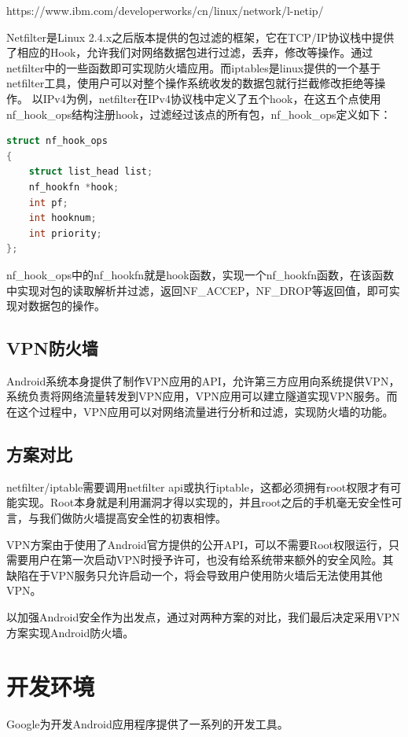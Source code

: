 \documentclass[format=final, language=chinese, degree=fyp]{hustthesis}
\begin{document}
https://www.ibm.com/developerworks/cn/linux/network/l-netip/

Netfilter是Linux 2.4.x之后版本提供的包过滤的框架，它在TCP/IP协议栈中提供了相应的Hook，允许我们对网络数据包进行过滤，丢弃，修改等操作。通过netfilter中的一些函数即可实现防火墙应用。而iptables是linux提供的一个基于netfilter工具，使用户可以对整个操作系统收发的数据包就行拦截修改拒绝等操作。
以IPv4为例，netfilter在IPv4协议栈中定义了五个hook，在这五个点使用nf\_hook\_ops结构注册hook，过滤经过该点的所有包，nf\_hook\_ops定义如下：

\begin{lstlisting}[language=c]
struct nf_hook_ops
{
    struct list_head list;
    nf_hookfn *hook;
    int pf;
    int hooknum;
    int priority;
};
\end{lstlisting}

nf\_hook\_ops中的nf\_hookfn就是hook函数，实现一个nf\_hookfn函数，在该函数中实现对包的读取解析并过滤，返回NF\_ACCEP，NF\_DROP等返回值，即可实现对数据包的操作。

\subsection{VPN防火墙}

Android系统本身提供了制作VPN应用的API，允许第三方应用向系统提供VPN，系统负责将网络流量转发到VPN应用，VPN应用可以建立隧道实现VPN服务。而在这个过程中，VPN应用可以对网络流量进行分析和过滤，实现防火墙的功能。

\subsection{方案对比}
netfilter/iptable需要调用netfilter api或执行iptable，这都必须拥有root权限才有可能实现。Root本身就是利用漏洞才得以实现的，并且root之后的手机毫无安全性可言，与我们做防火墙提高安全性的初衷相悖。

VPN方案由于使用了Android官方提供的公开API，可以不需要Root权限运行，只需要用户在第一次启动VPN时授予许可，也没有给系统带来额外的安全风险。其缺陷在于VPN服务只允许启动一个，将会导致用户使用防火墙后无法使用其他VPN。

以加强Android安全作为出发点，通过对两种方案的对比，我们最后决定采用VPN方案实现Android防火墙。

\section{开发环境}

Google为开发Android应用程序提供了一系列的开发工具。
\end{document}
